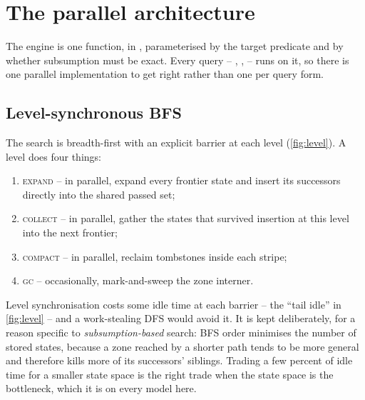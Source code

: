\section{The parallel architecture}
\label{sec:parallel}

\FigLayers

The engine is one function,  in ,
parameterised by the target predicate and by whether subsumption must be exact.
Every query -- , ,  -- runs on it, so
there is one parallel implementation to get right rather than one per query
form.

\subsection{Level-synchronous BFS}

The search is breadth-first with an explicit barrier at each level
(\cref{fig:level}).  A level does four things:

\begin{enumerate}[leftmargin=1.7em, itemsep=2pt]
\item \textsc{expand} -- in parallel, expand every frontier state and insert
      its successors directly into the shared passed set;
\item \textsc{collect} -- in parallel, gather the states that survived
      insertion at this level into the next frontier;
\item \textsc{compact} -- in parallel, reclaim tombstones inside each stripe;
\item \textsc{gc} -- occasionally, mark-and-sweep the zone interner.
\end{enumerate}

\FigLevel

Level synchronisation costs some idle time at each barrier -- the ``tail idle''
in \cref{fig:level} -- and a work-stealing DFS would avoid it.  It is kept
deliberately, for a reason specific to \emph{subsumption-based} search: BFS
order minimises the number of stored states, because a zone reached by a
shorter path tends to be more general and therefore kills more of its
successors' siblings.  Trading a few percent of idle time for a smaller state
space is the right trade when the state space is the bottleneck, which it is on
every model here.

